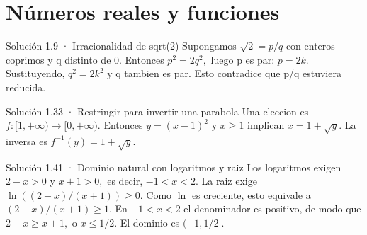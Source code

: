\documentclass[10pt,a4paper,oneside,openany]{book}
\begin{document}
\chapter{Números reales y funciones}
\begin{PSevenSolutionFixed}{Solución 1.9 · Irracionalidad de sqrt(2)}
Supongamos \(\sqrt{2}=p/q\) con enteros coprimos y q distinto de \(0\). Entonces \(p^{2}=2q^{2},\) luego p es par: \(p=2k\). Sustituyendo, \(q^{2}=2k^{2}\) y q tambien es par. Esto contradice que p/q estuviera reducida.
\end{PSevenSolutionFixed}
\begin{PSevenSolutionFixed}{Solución 1.33 · Restringir para invertir una parabola}
Una eleccion es \(f:[1,+\infty )\to [0,+\infty )\). Entonces \(y=(x-1)^{2}\) y \(x\ge 1\) implican \(x=1+\sqrt{y}\). La inversa es \(f^{-1}(y)=1+\sqrt{y}\).
\end{PSevenSolutionFixed}
\begin{PSevenSolutionFixed}{Solución 1.41 · Dominio natural con logaritmos y raiz}
Los logaritmos exigen \(2-x>0\) y \(x+1>0,\) es decir, \(-1<x<2\). La raiz exige \(\ln((2-x)/(x+1))\ge 0\). Como \(\ln\) es creciente, esto equivale a \((2-x)/(x+1)\ge 1\). En \(-1<x<2\) el denominador es positivo, de modo que \(2-x\ge x+1,\) o \(x\le 1/2\). El dominio es \((-1,1/2]\).
\end{PSevenSolutionFixed}
\end{document}
